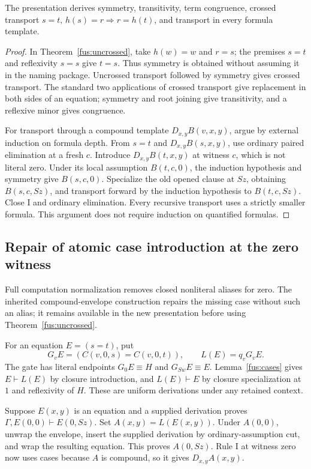 \begin{corollary}
\label{fus:equality}
The presentation derives symmetry, transitivity, term congruence, crossed
transport $s=t,\,h(s)=r\Rightarrow r=h(t)$, and transport in every formula
template.
\end{corollary}
\begin{proof}
In Theorem~\ref{fus:uncrossed}, take $h(w)=w$ and $r=s$; the premises
$s=t$ and reflexivity $s=s$ give $t=s$. Thus symmetry is obtained without
assuming it in the naming package. Uncrossed transport followed by symmetry
gives crossed transport. The standard two applications of crossed transport
give replacement in both sides of an equation; symmetry and root joining
give transitivity, and a reflexive minor gives congruence.

For transport through a compound template $D_{x,y}B(v,x,y)$, argue by
external induction on formula depth. From $s=t$ and $D_{x,y}B(s,x,y)$,
use ordinary paired elimination at a fresh $c$. Introduce
$D_{x,y}B(t,x,y)$ at witness $c$, which is not literal zero. Under its
local assumption $B(t,c,0)$, the induction hypothesis and symmetry give
$B(s,c,0)$. Specialize the old opened clause at $Sz$, obtaining
$B(s,c,Sz)$, and transport forward by the induction hypothesis to
$B(t,c,Sz)$. Close I and ordinary elimination. Every recursive transport
uses a strictly smaller formula. This argument does not require induction
on quantified formulas.
\end{proof}

\subsection{Repair of atomic case introduction at the zero witness}
\label{fus:repair}

Full computation normalization removes closed nonliteral aliases for zero.
The inherited compound-envelope construction repairs the missing case
without such an alias; it remains available in the new presentation before
using Theorem~\ref{fus:uncrossed}.

For an equation $E=(s=t)$, put
\[
 G_vE=(C(v,0,s)=C(v,0,t)),\qquad L(E)=q_vG_vE.
\]
The gate has literal endpoints $G_0E\equiv H$ and $G_{Sw}E\equiv E$.
Lemma~\ref{fus:cases} gives $E\vdash L(E)$ by closure introduction,
and $L(E)\vdash E$ by closure specialization at $1$ and reflexivity of
$H$. These are uniform derivations under any retained context.

Suppose $E(x,y)$ is an equation and a supplied derivation proves
$\Gamma,E(0,0)\vdash E(0,Sz)$. Set $A(x,y)=L(E(x,y))$.
Under $A(0,0)$, unwrap the envelope, insert the supplied derivation by
ordinary-assumption cut, and wrap the resulting equation. This proves
$A(0,Sz)$. Rule I at witness zero now uses cases because $A$ is compound,
so it gives $D_{x,y}A(x,y)$.

